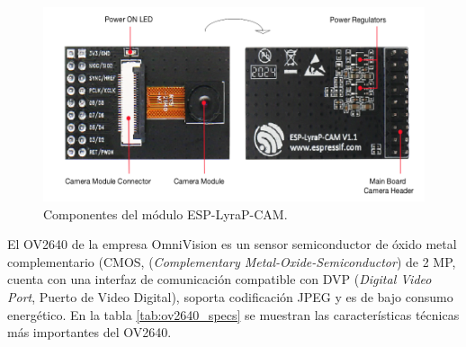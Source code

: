 \begin{figure}[h]
	\centering
	\includegraphics[scale=0.6]{./Figures/camera_blocks.png}
	\caption{Componentes del módulo ESP-LyraP-CAM\protect\footnotemark.}
	\label{fig:camera_comp}
\end{figure}

El OV2640 de la empresa OmniVision es un sensor semiconductor de óxido metal complementario (CMOS, (\textit{Complementary Metal-Oxide-Semiconductor}) de 2 MP, cuenta con una interfaz de comunicación compatible con DVP  (\textit{Digital Video Port}, Puerto de Video Digital), soporta codificación JPEG y es de bajo consumo energético. En la tabla \ref{tab:ov2640_specs} se muestran las características técnicas más importantes del OV2640.

